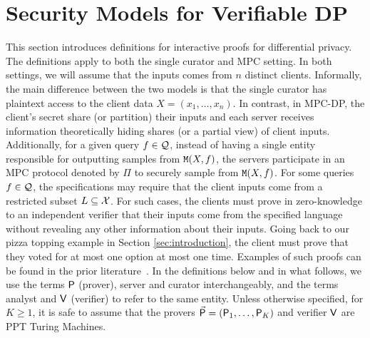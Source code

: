\section{Security Models for Verifiable DP}
\label{sec:model}



This section introduces definitions for interactive proofs for differential privacy. The definitions apply to both the single curator and MPC setting.
In both settings, we will assume that the inputs comes from $n$ distinct clients.
Informally, the main difference between the two
models is that the single curator has plaintext access to the client data $X = (x_1, \dots, x_n)$. 
In contrast, in MPC-DP, the client's secret share (or partition) their inputs and each server receives information theoretically hiding shares (or a partial view) of client inputs. 
Additionally, for a given query $f \in \mathcal{Q}$, instead of having a single entity responsible for outputting samples from $\mathtt{M}(X, f)$, the servers participate in an MPC protocol denoted by $\Pi$ to securely sample from $\mathtt{M}(X, f)$.
For some queries $f \in \mathcal{Q}$, the specifications may require that the client inputs come from a restricted subset $L \subseteq \mathcal{X}$.
For such cases, the clients must prove in zero-knowledge to an independent verifier that their inputs come from the specified language without revealing any other information about their inputs. Going back to our pizza topping example in Section \ref{sec:introduction}, the client must prove that they voted for at most one option at most one time.  
Examples of such proofs can be found in the prior literature~\cite{boneh_lightweight_2022,
  boyle2019secure, corrigan-gibbs_prio_2017, bunz2018bulletproofs}.
In the definitions below and in what follows, we use the terms $\mathsf{P}$
(prover), server and curator interchangeably, and the terms analyst and
$\mathsf{V}$ (verifier) to refer to the same entity. Unless otherwise specified, for $K \geq 1$, it is safe to assume that the provers $\vec{\mathsf{P}} = (\mathsf{P}_1, \dots, \mathsf{P}_K)$ and verifier $\mathsf{V}$ are PPT Turing Machines.

